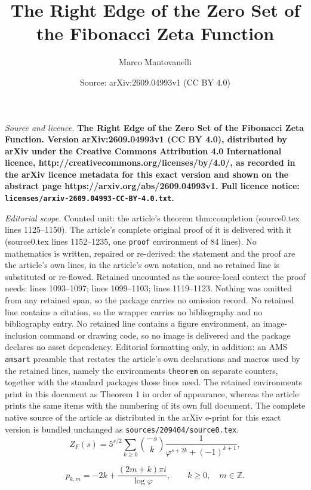 \documentclass[10pt,a4paper]{amsart}
\title{\bfseries The Right Edge of the Zero Set of the Fibonacci Zeta Function}
\author{Marco Mantovanelli}
\date{Source: arXiv:2609.04993v1 (CC BY 4.0)}
\newcommand{\ZF}{Z_F}
\begin{document}
\maketitle

\noindent\emph{Source and licence.} \bfseries The Right Edge of the Zero Set of the Fibonacci Zeta Function. Version arXiv:2609.04993v1 (CC BY 4.0), distributed by arXiv under the Creative Commons Attribution 4.0 International licence, http://creativecommons.org/licenses/by/4.0/, as recorded in the arXiv licence metadata for this exact version and shown on the abstract page https://arxiv.org/abs/2609.04993v1. Full licence notice: \texttt{licenses/arxiv-2609.04993-CC-BY-4.0.txt}.\par\smallskip

\noindent\textit{Editorial scope.} Counted unit: the article's theorem thm:completion (source0.tex lines 1125--1150). The article's complete original proof of it is delivered with it (source0.tex lines 1152--1235, one \texttt{proof} environment of 84 lines). No mathematics is written, repaired or re-derived: the statement and the proof are the article's own lines, in the article's own notation, and no retained line is substituted or re-flowed.  Retained uncounted as the source-local context the proof needs: lines 1093--1097; lines 1099--1103; lines 1119--1123.  Nothing was omitted from any retained span, so the package carries no omission record.  No retained line contains a citation, so the wrapper carries no bibliography and no bibliography entry.  No retained line contains a figure environment, an image-inclusion command or drawing code, so no image is delivered and the package declares no asset dependency.  Editorial formatting only, in addition: an AMS \texttt{amsart} preamble that restates the article's own declarations and macros used by the retained lines, namely the environments \texttt{theorem} on separate counters, together with the standard packages those lines need.  The retained environments print in this document as Theorem 1 in order of appearance, whereas the article prints the same items with the numbering of its own full document.  The complete native source of the article as distributed in the arXiv e-print for this exact version is bundled unchanged as \texttt{sources/209404/source0.tex}.
\begin{equation}\label{eq:global-continuation}
\ZF(s)
=5^{s/2}\sum_{k\ge0}\binom{-s}{k}
\frac{1}{\varphi^{s+2k}+(-1)^{k+1}},
\end{equation}

\begin{equation}\label{eq:pole-lattice}
p_{k,m}
=-2k+\frac{(2m+k)\pi i}{\log\varphi},
\qquad k\ge0,\quad m\in\mathbb Z.
\end{equation}
\end{document}
